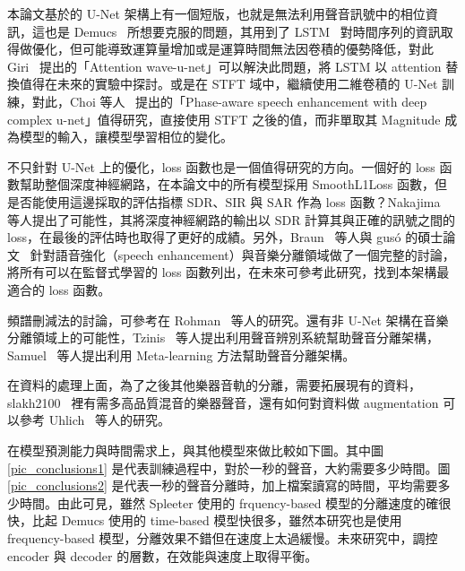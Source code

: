 本論文基於的 U-Net 架構上有一個短版，也就是無法利用聲音訊號中的相位資訊，這也是 Demucs~\cite{defossez2019music} 所想要克服的問題，其用到了 LSTM~\cite{gers1999learning} 對時間序列的資訊取得做優化，但可能導致運算量增加或是運算時間無法因卷積的優勢降低，對此 Giri~\cite{giri2019attention} 提出的「Attention wave-u-net」可以解決此問題，將 LSTM 以 attention 替換值得在未來的實驗中探討。或是在 STFT 域中，繼續使用二維卷積的 U-Net 訓練，對此，Choi 等人~\cite{choi2018phase} 提出的「Phase-aware speech enhancement with deep complex u-net」值得研究，直接使用 STFT 之後的值，而非單取其 Magnitude 成為模型的輸入，讓模型學習相位的變化。

不只針對 U-Net 上的優化，loss 函數也是一個值得研究的方向。一個好的 loss 函數幫助整個深度神經網路，在本論文中的所有模型採用 SmoothL1Loss 函數，但是否能使用這邊採取的評估指標 SDR、SIR 與 SAR 作為 loss 函數？Nakajima~\cite{nakajima2018monaural} 等人提出了可能性，其將深度神經網路的輸出以 SDR 計算其與正確的訊號之間的 loss，在最後的評估時也取得了更好的成績。另外，Braun~\cite{braun2020consolidated} 等人與 gusó 的碩士論文~\cite{guso2020on_loss_functions} 針對語音強化（speech enhancement）與音樂分離領域做了一個完整的討論，將所有可以在監督式學習的 loss 函數列出，在未來可參考此研究，找到本架構最適合的 loss 函數。

頻譜刪減法的討論，可參考在 Rohman~\cite{rohman2016novel} 等人的研究。還有非 U-Net 架構在音樂分離領域上的可能性，Tzinis~\cite{tzinis2020improving} 等人提出利用聲音辨別系統幫助聲音分離架構，Samuel~\cite{samuel2020meta} 等人提出利用 Meta-learning 方法幫助聲音分離架構。

在資料的處理上面，為了之後其他樂器音軌的分離，需要拓展現有的資料，slakh2100~\cite{manilow2019cutting} 裡有需多高品質混音的樂器聲音，還有如何對資料做 augmentation 可以參考 Uhlich~\cite{uhlich2017improving} 等人的研究。

在模型預測能力與時間需求上，與其他模型來做比較如下圖。其中圖\ref{pic_conclusions1} 是代表訓練過程中，對於一秒的聲音，大約需要多少時間。圖\ref{pic_conclusions2} 是代表一秒的聲音分離時，加上檔案讀寫的時間，平均需要多少時間。由此可見，雖然 Spleeter 使用的 frquency-based 模型的分離速度的確很快，比起 Demucs 使用的 time-based 模型快很多，雖然本研究也是使用 frequency-based 模型，分離效果不錯但在速度上太過緩慢。未來研究中，調控 encoder 與 decoder 的層數，在效能與速度上取得平衡。

